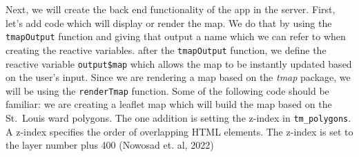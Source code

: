 \documentclass[
  krantz2]{krantz}
\makeatletter
\newenvironment{Shaded}{\begin{snugshade}}{\end{snugshade}}
\newcommand{\AttributeTok}[1]{\textcolor[rgb]{0.61,0.61,0.61}{#1}}
\newcommand{\CommentTok}[1]{\textcolor[rgb]{0.37,0.37,0.37}{\textit{#1}}}
\newcommand{\ControlFlowTok}[1]{\textcolor[rgb]{0.27,0.27,0.27}{\textbf{#1}}}
\newcommand{\DecValTok}[1]{\textcolor[rgb]{0.06,0.06,0.06}{#1}}
\newcommand{\FunctionTok}[1]{\textcolor[rgb]{0,0,0}{#1}}
\newcommand{\NormalTok}[1]{#1}
\newcommand{\OtherTok}[1]{\textcolor[rgb]{0.37,0.37,0.37}{#1}}
\newcommand{\SpecialCharTok}[1]{\textcolor[rgb]{0,0,0}{#1}}
\newcommand{\StringTok}[1]{\textcolor[rgb]{0.5,0.5,0.5}{#1}}
\newenvironment{kframe}{%
\medskip{}
\setlength{\fboxsep}{.8em}
 \def\at@end@of@kframe{}%
 \ifinner\ifhmode%
  \def\at@end@of@kframe{\end{minipage}}%
  \begin{minipage}{\columnwidth}%
 \fi\fi%
 \def\FrameCommand##1{\hskip\@totalleftmargin \hskip-\fboxsep
 \colorbox{shadecolor}{##1}\hskip-\fboxsep
     \hskip-\linewidth \hskip-\@totalleftmargin \hskip\columnwidth}%
 \MakeFramed {\advance\hsize-\width
   \@totalleftmargin\z@ \linewidth\hsize
   \@setminipage}}%
 {\par\unskip\endMakeFramed%
 \at@end@of@kframe}
\renewenvironment{Shaded}{\begin{kframe}}{\end{kframe}}
\makeatother
\begin{document}
Next, we will create the back end functionality of the app in the server. First, let's add code which will display or render the map. We do that by using the \texttt{tmapOutput} function and giving that output a name which we can refer to when creating the reactive variables. after the \texttt{tmapOutput} function, we define the reactive variable \texttt{output\$map} which allows the map to be instantly updated based on the user's input. Since we are rendering a map based on the \emph{tmap} package, we will be using the \texttt{renderTmap} function. Some of the following code should be familiar: we are creating a leaflet map which will build the map based on the St.~Louis ward polygons. The one addition is setting the z-index in \texttt{tm\_polygons}. A z-index specifies the order of overlapping HTML elements. The z-index is set to the layer number plus 400 (Nowosad et. al, 2022)

\begin{Shaded}
\end{Shaded}
\end{document}
